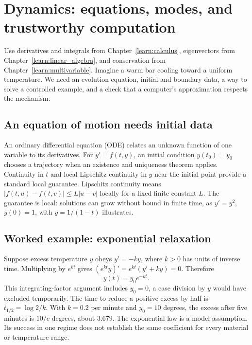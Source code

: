 \chapter{Dynamics: equations, modes, and trustworthy computation}
\label{learn:dynamics}



Use derivatives and integrals from Chapter~\ref{learn:calculus}, eigenvectors
from Chapter~\ref{learn:linear_algebra}, and conservation from
Chapter~\ref{learn:multivariable}. Imagine a warm bar cooling toward a
uniform temperature. We need an evolution equation, initial and boundary
data, a way to solve a controlled example, and a check that a computer's
approximation respects the mechanism.



\section{An equation of motion needs initial data}
An ordinary differential equation (ODE) relates an unknown function of one
variable to its derivatives. For $y'=f(t,y)$, an initial condition
$y(t_0)=y_0$ chooses a trajectory when an existence and uniqueness theorem
applies. Continuity in $t$ and local Lipschitz continuity in $y$ near the
initial point provide a standard local guarantee. Lipschitz continuity means
$|f(t,u)-f(t,v)|\leq L|u-v|$ locally for a fixed finite constant $L$.
The guarantee is local: solutions can grow without bound in finite time,
as $y'=y^2$, $y(0)=1$, with $y=1/(1-t)$ illustrates.

\section{Worked example: exponential relaxation}
Suppose excess temperature $y$ obeys $y'=-ky$, where $k>0$ has units of
inverse time. Multiplying by $e^{kt}$ gives
$(e^{kt}y)'=e^{kt}(y'+ky)=0$. Therefore
\[
 y(t)=y_0e^{-kt}.
\]
This integrating-factor argument includes $y_0=0$, a case division by $y$
would have excluded temporarily. The time to reduce a positive excess by
half is $t_{1/2}=\log2/k$. With $k=0.2$ per minute and $y_0=10$ degrees,
the excess after five minutes is $10/e$ degrees, about $3.679$.
The exponential law is a model assumption. Its success in one regime does
not establish the same coefficient for every material or temperature range.

